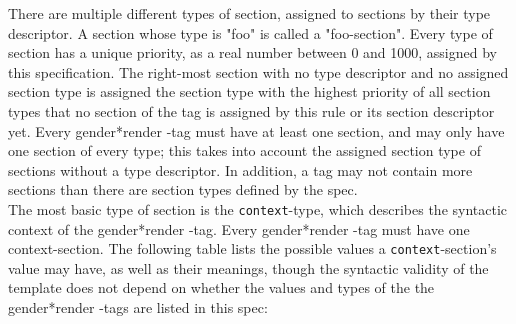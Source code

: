 \documentclass{article}
\newcommand{\GenderRender}{
    gender*render
}
\begin{document}
    There are multiple different types of section, assigned to sections by their type descriptor.
    A section whose type is "foo" is called a "foo-section".
    Every type of section has a unique priority, as a real number between 0 and 1000, assigned by this specification.
    The right-most section with no type descriptor and no assigned section type is assigned the section type with the highest priority of all section types that no section of the tag is assigned by this rule or its section descriptor yet.
    Every \GenderRender-tag must have at least one section, and may only have one section of every type;
    this takes into account the assigned section type of sections without a type descriptor.
    In addition, a tag may not contain more sections than there are section types defined by the spec.\\

    The most basic type of section is the \texttt{context}-type, which describes the syntactic context of the \GenderRender-tag.
    Every \GenderRender-tag must have one context-section.
    The following table lists the possible values a \texttt{context}-section's value may have, as well as their meanings, though the syntactic validity of the template does not depend on whether the values and types of the the \GenderRender-tags are listed in this spec:
\end{document}
